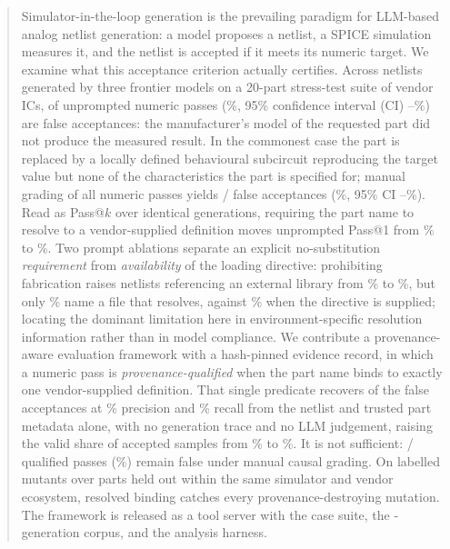 \maketitle
\begin{abstract}
Simulator-in-the-loop generation is the prevailing paradigm for LLM-based
analog netlist generation: a model proposes a netlist, a SPICE simulation
measures it, and the netlist is accepted if it meets its numeric target. We
examine what this acceptance criterion actually certifies. Across
\NumNetlists{} netlists generated by three frontier models on a 20-part
stress-test suite of vendor ICs, \BareFalse{} of \BarePasses{} unprompted
numeric passes (\BareFalseRate{}\%, 95\% confidence interval (CI)
\BareFalseCILo{}--\BareFalseCIHi{}\%) are false acceptances: the
manufacturer's model of the requested part did not produce the measured
result. In the commonest case the part is replaced by a locally defined
behavioural subcircuit reproducing the target value but none of the
characteristics the part is specified for; manual grading of all
\NumNumericPass{} numeric passes yields
\FalseAcceptTotal{}/\NumNumericPass{} false acceptances (\FalseAcceptRate{}\%,
95\% CI \FalseAcceptCILo{}--\FalseAcceptCIHi{}\%). Read as Pass@$k$ over
identical generations, requiring the part name to resolve to a
vendor-supplied definition moves unprompted Pass@1 from
\PassOneBareNumeric{}\% to \PassOneBareProv{}\%. Two prompt ablations separate
an explicit no-substitution \emph{requirement} from \emph{availability} of the
loading directive: prohibiting fabrication raises netlists referencing an
external library from \FactBareRefRate{}\% to \FactRequirementRefRate{}\%, but
only \FactRequirementResRate{}\% name a file that resolves, against
\FactLibraryResRate{}\% when the directive is supplied; locating the dominant
limitation here in environment-specific resolution information rather than in
model compliance. We contribute a provenance-aware evaluation framework with a
hash-pinned evidence record, in which a numeric pass is
\emph{provenance-qualified} when the part name binds to exactly one
vendor-supplied definition. That single predicate recovers \ProvTP{} of the
\FalseAcceptTotal{} false acceptances at \ProvPrecision{}\% precision and
\ProvRecall{}\% recall from the netlist and trusted part metadata alone, with
no generation trace and no LLM judgement, raising the valid share of accepted
samples from \StageNumericValidShare{}\% to \StageProvValidShare{}\%. It is
not sufficient: \ProvFN{}/\StageProvAccepted{} qualified passes
(\StageProvFalseShare{}\%) remain false under manual causal grading. On
\MutTotal{} labelled mutants over \MutParts{} parts held out within the same
simulator and vendor ecosystem, resolved binding catches every
provenance-destroying mutation. The framework is released as a tool server
with the case suite, the \CorpusTotal{}-generation corpus, and the analysis
harness.
\end{abstract}

